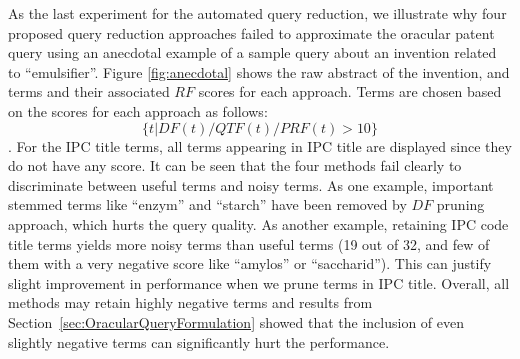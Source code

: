 As the last experiment for the automated query reduction, we illustrate why four proposed query reduction approaches failed to approximate the oracular patent query using an anecdotal example of a sample query about an invention related to ``emulsifier''. 
Figure \ref{fig:anecdotal} shows the raw abstract of the invention, and terms and their associated $\mathit{RF}$ scores for each approach. 
Terms are chosen based on the scores for each approach as follows: 
\begin{displaymath}\{t| DF(t)/QTF(t)/PRF(t)>10\}\end{displaymath}.
For the IPC title terms, all terms appearing in IPC title are displayed since they do not have any score.   
It can be seen that the four methods fail clearly to discriminate between useful terms and noisy terms. As one example, important stemmed terms like ``enzym'' and ``starch'' have been removed by $\mathit{DF}$ pruning approach, which hurts the query quality.  As another example, retaining IPC code title terms yields more noisy terms than useful terms (19 out of 32, and few of them with a very negative score like ``amylos'' or ``saccharid''). This can justify slight improvement in performance when we prune terms in IPC title. Overall, all methods may retain highly negative terms and results from Section~\ref{sec:OracularQueryFormulation} showed that the inclusion of even slightly negative terms can significantly hurt the performance.

